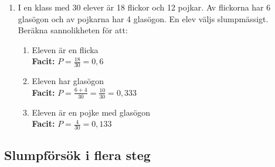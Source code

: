 \documentclass[a4paper,11pt]{article}
\begin{document}
\begin{enumerate}[label=\textbf{\arabic*.}]
    \item I en klass med 30 elever är 18 flickor och 12 pojkar. Av flickorna har 6 glasögon och av pojkarna har 4 glasögon. En elev väljs slumpmässigt. Beräkna sannolikheten för att:
    \begin{enumerate}[label=\alph*)]
        \item Eleven är en flicka
        \\ \textbf{Facit:} $P=\frac{18}{30}=0,6$
        \item Eleven har glasögon
        \\ \textbf{Facit:} $P=\frac{6+4}{30}=\frac{10}{30}=0,333$
        \item Eleven är en pojke med glasögon
        \\ \textbf{Facit:} $P=\frac{4}{30}=0,133$
    \end{enumerate}
\end{enumerate}

\subsection*{Slumpförsök i flera steg}
\end{document}
